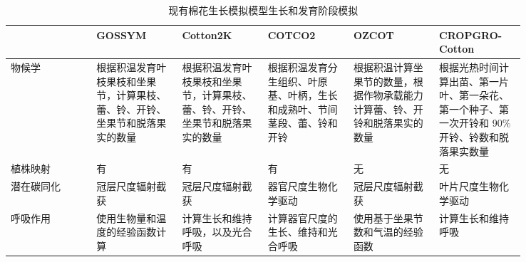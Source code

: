 \begin{table}
    \small
    \caption{现有棉花生长模拟模型生长和发育阶段模拟}
    \label{tab:growdev}
    \begin{tabular}{p{0.14\linewidth}p{0.14\linewidth}p{0.14\linewidth}p{0.14\linewidth}p{0.14\linewidth}p{0.14\linewidth}}
        \toprule
                   & GOSSYM                                                                       & Cotton2K                                                                     & COTCO2                                                                   & OZCOT                                                                      & CROPGRO-Cotton                                                                                   \\
        \midrule
        物候学     & 根据积温发育叶枝果枝和坐果节，计算果枝、蕾、铃、开铃、坐果节和脱落果实的数量 & 根据积温发育叶枝果枝和坐果节，计算果枝、蕾、铃、开铃、坐果节和脱落果实的数量 & 根据积温发育分生组织、叶原基、叶柄，生长和成熟叶、节间茎段、蕾、铃和开铃 & 根据积温计算坐果节的数量，根据作物承载能力计算蕾、铃、开铃和脱落果实的数量 & 根据光热时间计算出苗、第一片叶、第一朵花、第一个种子、第一次开铃和 90\% 开铃、铃数和脱落果实数量 \\
        植株映射   & 有                                                                           & 有                                                                           & 有                                                                       & 无                                                                         & 无                                                                                               \\
        潜在碳同化 & 冠层尺度辐射截获                                                             & 冠层尺度辐射截获                                                             & 器官尺度生物化学驱动\cite{farquhar1980}                                  & 冠层尺度辐射截获                                                           & 叶片尺度生物化学驱动\cite{farquhar1980}                                                          \\
        呼吸作用   & 使用生物量和温度的经验函数计算                                               & 计算生长和维持呼吸，以及光合呼吸                                             & 计算器官尺度的生长、维持和光合呼吸                                       & 使用基于坐果节数和气温的经验函数                                           & 计算生长和维持呼吸                                                                               \\

\end{tabular}
\end{table}
